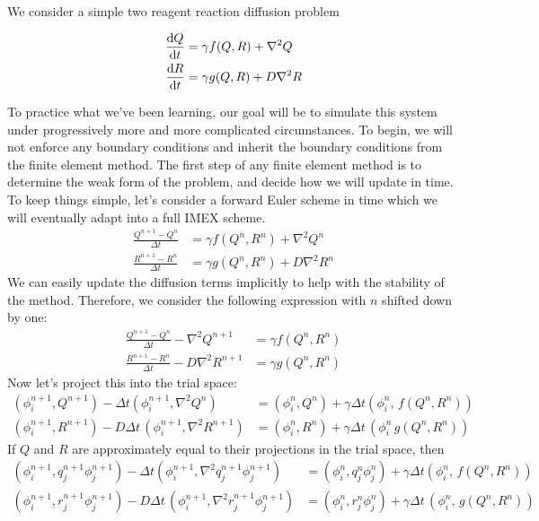 \documentclass{article}
\begin{document}
We consider a simple two reagent reaction diffusion problem

\begin{align}
    \diff{Q}{t} &= \gamma f(Q,R) + \nabla^2 Q\\
    \diff{R}{t} &= \gamma g(Q,R) + D\nabla^2 R
\end{align}

To practice what we've been learning, our goal will be to simulate this system
under progressively more and more complicated circumstances. To begin, we will
not enforce any boundary conditions and inherit the boundary conditions from
the finite element method. The first step of any finite element method is to 
determine the weak form of the problem, and decide how we will update in time.
To keep things simple, let's consider a forward Euler scheme in time which we 
will eventually adapt into a full IMEX scheme.
\begin{align}
    \frac{Q^{n+1}-Q^n}{\Delta t} &= \gamma f(Q^n, R^n) + \nabla^2 Q^n\\
    \frac{R^{n+1}-R^n}{\Delta t} &= \gamma g(Q^n, R^n) + D\nabla^2 R^n
\end{align}
We can easily update the diffusion terms implicitly to help with the stability
of the method. Therefore, we consider the following expression with $n$ shifted
down by one:
\begin{align}
    \frac{Q^{n+1}-Q^{n}}{\Delta t} - \nabla^2 Q^{n+1}  &= \gamma f(Q^{n}, R^{n})\\
    \frac{R^{n+1}-R^{n}}{\Delta t} - D\nabla^2 R^{n+1} &= \gamma g(Q^{n}, R^{n})
\end{align}
Now let's project this into the trial space:
\begin{align}
    (\phi_i^{n+1}, Q^{n+1}) - \Delta t (\phi_i^{n+1}, \nabla^2 Q^n)
    &= (\phi_i^n, Q^{n}) + \gamma \Delta t (\phi_i^{n},\, f(Q^{n}, R^{n}))\\
    (\phi_i^{n+1}, R^{n+1}) - D\Delta t\, (\phi_i^{n+1},\nabla^2 R^{n+1})
    &= (\phi_i^n, R^{n}) + \gamma \Delta t\, (\phi_i^{n}\, g(Q^{n}, R^{n}))
\end{align}
If $Q$ and $R$ are approximately equal to their projections in the trial space,
then
\begin{align}
    (\phi_i^{n+1}, q_j^{n+1}\phi_j^{n+1}) - \Delta t (\phi_i^{n+1}, \nabla^2 q_j^{n+1} \phi_j^{n+1})
    &= (\phi_i^{n}, q_j^{n}\phi_j^{n}) + \gamma \Delta t (\phi_i^{n},\, f(Q^{n}, R^{n}))\\
    (\phi_i^{n+1}, r_j^{n+1} \phi_j^{n+1}) - D\Delta t\, (\phi_i^{n+1},\nabla^2 r_j^{n+1}\phi_j^{n+1})
    &= (\phi_i^n, r_j^{n}\phi_j^{n}) + \gamma \Delta t\, (\phi_i^{n},\, g(Q^{n}, R^{n}))
\end{align}
\end{document}
